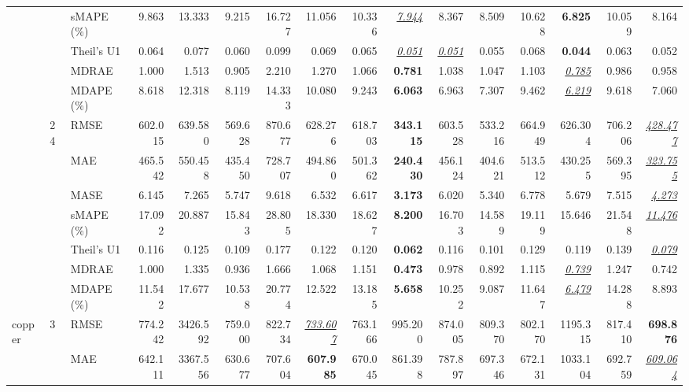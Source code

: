 \begin{table}[!htbp]
{\begin{tabular}{lllrrrrrrrrrrrrr}
 &  & sMAPE (\%) & 9.863 & 13.333 & 9.215 & 16.727 & 11.056 & 10.336 & \underline{\textit{7.944}} & 8.367 & 8.509 & 10.628 & \textbf{6.825} & 10.059 & 8.164 \\
 &  & Theil's U1 & 0.064 & 0.077 & 0.060 & 0.099 & 0.069 & 0.065 & \underline{\textit{0.051}} & \underline{\textit{0.051}} & 0.055 & 0.068 & \textbf{0.044} & 0.063 & 0.052 \\
 &  & MDRAE & 1.000 & 1.513 & 0.905 & 2.210 & 1.270 & 1.066 & \textbf{0.781} & 1.038 & 1.047 & 1.103 & \underline{\textit{0.785}} & 0.986 & 0.958 \\
 &  & MDAPE (\%) & 8.618 & 12.318 & 8.119 & 14.333 & 10.080 & 9.243 & \textbf{6.063} & 6.963 & 7.307 & 9.462 & \underline{\textit{6.219}} & 9.618 & 7.060 \\
\cmidrule(lr){2-16}
 & 24 & RMSE & 602.015 & 639.580 & 569.628 & 870.677 & 628.276 & 618.703 & \textbf{343.115} & 603.528 & 533.216 & 664.949 & 626.304 & 706.206 & \underline{\textit{428.477}} \\
 &  & MAE & 465.542 & 550.458 & 435.450 & 728.707 & 494.860 & 501.362 & \textbf{240.430} & 456.124 & 404.621 & 513.512 & 430.255 & 569.395 & \underline{\textit{323.755}} \\
 &  & MASE & 6.145 & 7.265 & 5.747 & 9.618 & 6.532 & 6.617 & \textbf{3.173} & 6.020 & 5.340 & 6.778 & 5.679 & 7.515 & \underline{\textit{4.273}} \\
 &  & sMAPE (\%) & 17.092 & 20.887 & 15.843 & 28.805 & 18.330 & 18.627 & \textbf{8.200} & 16.703 & 14.589 & 19.119 & 15.646 & 21.548 & \underline{\textit{11.476}} \\
 &  & Theil's U1 & 0.116 & 0.125 & 0.109 & 0.177 & 0.122 & 0.120 & \textbf{0.062} & 0.116 & 0.101 & 0.129 & 0.119 & 0.139 & \underline{\textit{0.079}} \\
 &  & MDRAE & 1.000 & 1.335 & 0.936 & 1.666 & 1.068 & 1.151 & \textbf{0.473} & 0.978 & 0.892 & 1.115 & \underline{\textit{0.739}} & 1.247 & 0.742 \\
 &  & MDAPE (\%) & 11.542 & 17.677 & 10.538 & 20.774 & 12.522 & 13.185 & \textbf{5.658} & 10.252 & 9.087 & 11.647 & \underline{\textit{6.479}} & 14.288 & 8.893 \\
\midrule
copper & 3 & RMSE & 774.242 & 3426.592 & 759.000 & 822.734 & \underline{\textit{733.607}} & 763.166 & 995.200 & 874.005 & 809.370 & 802.170 & 1195.315 & 817.410 & \textbf{698.876} \\
 &  & MAE & 642.111 & 3367.556 & 630.677 & 707.604 & \textbf{607.985} & 670.045 & 861.398 & 787.897 & 697.346 & 672.131 & 1033.104 & 692.759 & \underline{\textit{609.064}} \\

\end{tabular}}
\end{table}
